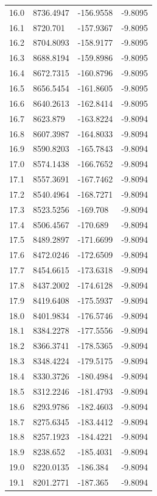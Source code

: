 \begin{table}[H]
\begin{tabular}{llll}
16.0 & 8736.4947 & -156.9558 & -9.8095 \\
16.1 & 8720.701 & -157.9367 & -9.8095 \\
16.2 & 8704.8093 & -158.9177 & -9.8095 \\
16.3 & 8688.8194 & -159.8986 & -9.8095 \\
16.4 & 8672.7315 & -160.8796 & -9.8095 \\
16.5 & 8656.5454 & -161.8605 & -9.8095 \\
16.6 & 8640.2613 & -162.8414 & -9.8095 \\
16.7 & 8623.879 & -163.8224 & -9.8094 \\
16.8 & 8607.3987 & -164.8033 & -9.8094 \\
16.9 & 8590.8203 & -165.7843 & -9.8094 \\
17.0 & 8574.1438 & -166.7652 & -9.8094 \\
17.1 & 8557.3691 & -167.7462 & -9.8094 \\
17.2 & 8540.4964 & -168.7271 & -9.8094 \\
17.3 & 8523.5256 & -169.708 & -9.8094 \\
17.4 & 8506.4567 & -170.689 & -9.8094 \\
17.5 & 8489.2897 & -171.6699 & -9.8094 \\
17.6 & 8472.0246 & -172.6509 & -9.8094 \\
17.7 & 8454.6615 & -173.6318 & -9.8094 \\
17.8 & 8437.2002 & -174.6128 & -9.8094 \\
17.9 & 8419.6408 & -175.5937 & -9.8094 \\
18.0 & 8401.9834 & -176.5746 & -9.8094 \\
18.1 & 8384.2278 & -177.5556 & -9.8094 \\
18.2 & 8366.3741 & -178.5365 & -9.8094 \\
18.3 & 8348.4224 & -179.5175 & -9.8094 \\
18.4 & 8330.3726 & -180.4984 & -9.8094 \\
18.5 & 8312.2246 & -181.4793 & -9.8094 \\
18.6 & 8293.9786 & -182.4603 & -9.8094 \\
18.7 & 8275.6345 & -183.4412 & -9.8094 \\
18.8 & 8257.1923 & -184.4221 & -9.8094 \\
18.9 & 8238.652 & -185.4031 & -9.8094 \\
19.0 & 8220.0135 & -186.384 & -9.8094 \\
19.1 & 8201.2771 & -187.365 & -9.8094 \\

\end{tabular}
\end{table}

